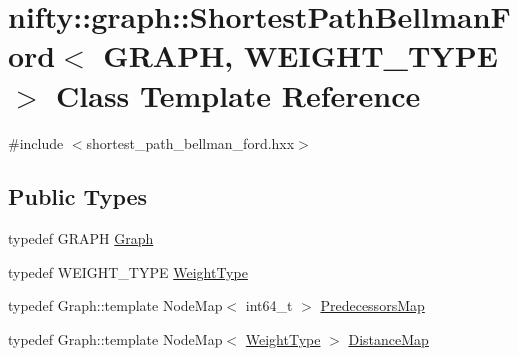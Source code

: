 \hypertarget{classnifty_1_1graph_1_1ShortestPathBellmanFord}{}\section{nifty\+:\+:graph\+:\+:Shortest\+Path\+Bellman\+Ford$<$ G\+R\+A\+P\+H, W\+E\+I\+G\+H\+T\+\_\+\+T\+Y\+P\+E $>$ Class Template Reference}
\label{classnifty_1_1graph_1_1ShortestPathBellmanFord}


{\ttfamily \#include $<$shortest\+\_\+path\+\_\+bellman\+\_\+ford.\+hxx$>$}

\subsection*{Public Types}
\begin{DoxyCompactItemize}
\item 
typedef G\+R\+A\+P\+H \hyperlink{classnifty_1_1graph_1_1ShortestPathBellmanFord_affd61ff19b32441c605a63759511cfdc}{Graph}
\item 
typedef W\+E\+I\+G\+H\+T\+\_\+\+T\+Y\+P\+E \hyperlink{classnifty_1_1graph_1_1ShortestPathBellmanFord_a0455c814a964983fe8b43278bb7528e8}{Weight\+Type}
\item 
typedef Graph\+::template Node\+Map$<$ int64\+\_\+t $>$ \hyperlink{classnifty_1_1graph_1_1ShortestPathBellmanFord_a871bb54c135ad8324dfff2d4a694372d}{Predecessors\+Map}
\item 
typedef Graph\+::template Node\+Map$<$ \hyperlink{classnifty_1_1graph_1_1ShortestPathBellmanFord_a0455c814a964983fe8b43278bb7528e8}{Weight\+Type} $>$ \hyperlink{classnifty_1_1graph_1_1ShortestPathBellmanFord_afb719c11ba9422051fa5650115735e46}{Distance\+Map}
\end{DoxyCompactItemize}
